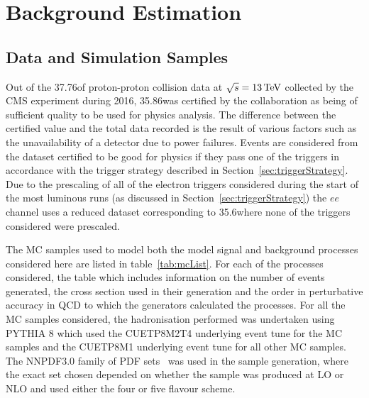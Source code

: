 \chapter{Background Estimation}\label{chapter:bkg}
%
%
%
%

\section{Data and Simulation Samples}\label{sec:samples}
Out of the 37.76\fbinv of  proton-proton collision data at $\sqrt{s} = 13\,\text{Te\hspace{-.08em}V}$ collected by the CMS experiment during 2016, 35.86\fbinv was certified by the collaboration as being of sufficient quality to be used for physics analysis.
The difference between the certified value and the total data recorded is the result of various factors such as the unavailability of a detector due to power failures.
Events are considered from the dataset certified to be good for physics if they pass one of the triggers in accordance with the trigger strategy described in Section~\ref{sec:triggerStrategy}.
Due to the prescaling of all of the electron triggers considered during the start of the most luminous runs (as discussed in Section~\ref{sec:triggerStrategy}) the $ee$ channel uses a reduced dataset corresponding to 35.6\fbinv where none of the triggers considered were prescaled.

The MC samples used to model both the model signal and background processes considered here are listed in table~\ref{tab:mcList}.
For each of the processes considered, the table which includes information on the number of events generated, the cross section used in their generation and the order in perturbative accuracy in QCD to which the generators calculated the processes.
For all the MC samples considered, the hadronisation performed was undertaken using PYTHIA 8 which used the CUETP8M2T4 underlying event tune for the \ttbar MC samples and the CUETP8M1 underlying event tune for all other MC samples.
The NNPDF3.0 family of PDF sets~\cite{Ball:2012cx} was used in the sample generation, where the exact set chosen depended on whether the sample was produced at LO or NLO and used either the four or five flavour scheme.

